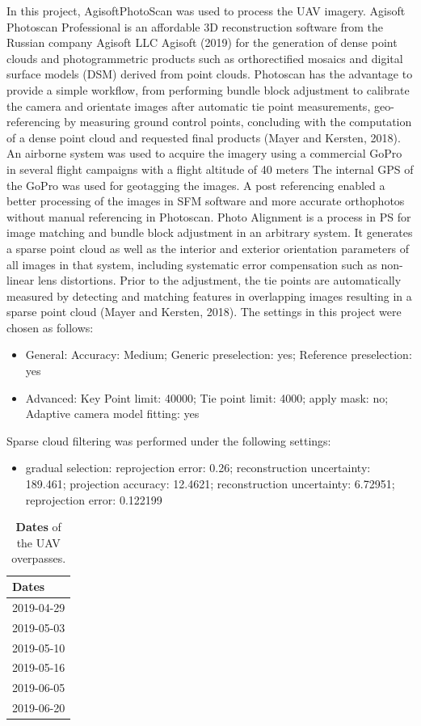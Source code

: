 \documentclass[]{article}
\providecommand{\tightlist}{%
  \setlength{\itemsep}{0pt}\setlength{\parskip}{0pt}}
\begin{document}
In this project, AgisoftPhotoScan was used to process the UAV imagery.
Agisoft Photoscan Professional is an affordable 3D reconstruction
software from the Russian company Agisoft LLC Agisoft (2019) for the
generation of dense point clouds and photogrammetric products such as
orthorectified mosaics and digital surface models (DSM) derived from
point clouds. Photoscan has the advantage to provide a simple workflow,
from performing bundle block adjustment to calibrate the camera and
orientate images after automatic tie point measurements, geo-referencing
by measuring ground control points, concluding with the computation of a
dense point cloud and requested final products (Mayer and Kersten,
2018). An airborne system was used to acquire the imagery using a
commercial GoPro in several flight campaigns with a flight altitude of
40 meters The internal GPS of the GoPro was used for geotagging the
images. A post referencing enabled a better processing of the images in
SFM software and more accurate orthophotos without manual referencing in
Photoscan. Photo Alignment is a process in PS for image matching and
bundle block adjustment in an arbitrary system. It generates a sparse
point cloud as well as the interior and exterior orientation parameters
of all images in that system, including systematic error compensation
such as non-linear lens distortions. Prior to the adjustment, the tie
points are automatically measured by detecting and matching features in
overlapping images resulting in a sparse point cloud (Mayer and Kersten,
2018). The settings in this project were chosen as follows:

\begin{itemize}
\item
  General: Accuracy: Medium; Generic preselection: yes; Reference
  preselection: yes
\item
  Advanced: Key Point limit: 40000; Tie point limit: 4000; apply mask:
  no; Adaptive camera model fitting: yes
\end{itemize}

Sparse cloud filtering was performed under the following settings:

\begin{itemize}
\tightlist
\item
  gradual selection: reprojection error: 0.26; reconstruction
  uncertainty: 189.461; projection accuracy: 12.4621; reconstruction
  uncertainty: 6.72951; reprojection error: 0.122199
\end{itemize}

\begin{table}[!h]

\caption{\label{tab:dates-table}\textbf{Dates} of the UAV overpasses.}
\centering
\begin{tabular}[t]{l}
\toprule
Dates\\
\midrule
2019-04-29\\
2019-05-03\\
2019-05-10\\
2019-05-16\\
2019-06-05\\
2019-06-20\\
\bottomrule
\end{tabular}
\end{table}
\end{document}
